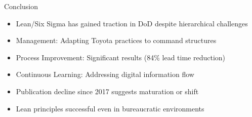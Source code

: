 \documentclass[aspectratio=169,11pt,xcolor={dvipsnames},hyperref={pdftex,pdfpagemode=UseNone,hidelinks,pdfdisplaydoctitle=true},usepdftitle=false]{beamer}
\begin{document}
    \begin{frame}{Conclusion}
      \begin{itemize}
        \item Lean/Six Sigma has gained traction in DoD despite hierarchical challenges
        \item Management: Adapting Toyota practices to command structures
        \item Process Improvement: Significant results (84\% lead time reduction)
        \item Continuous Learning: Addressing digital information flow
        \item Publication decline since 2017 suggests maturation or shift
        \item Lean principles successful even in bureaucratic environments
      \end{itemize}
    \end{frame}
    
    \lastslide
\end{document}
